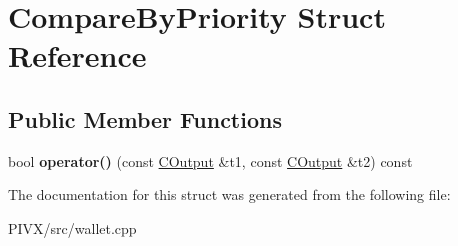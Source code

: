 \hypertarget{struct_compare_by_priority}{}\section{Compare\+By\+Priority Struct Reference}
\label{struct_compare_by_priority}
\subsection*{Public Member Functions}
\begin{DoxyCompactItemize}
\item 
\mbox{\label{struct_compare_by_priority_a880b81d741c9616f12799ff73becf4e3}} 
bool {\bfseries operator()} (const \mbox{\hyperlink{class_c_output}{C\+Output}} \&t1, const \mbox{\hyperlink{class_c_output}{C\+Output}} \&t2) const
\end{DoxyCompactItemize}


The documentation for this struct was generated from the following file\+:\begin{DoxyCompactItemize}
\item 
P\+I\+V\+X/src/wallet.\+cpp\end{DoxyCompactItemize}
